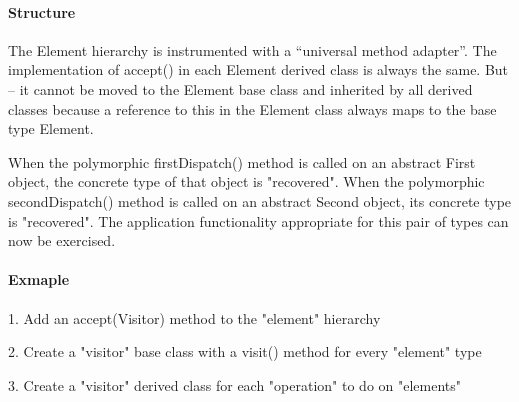\documentclass{book}
\begin{document}
\paragraph{Structure}
The Element hierarchy is instrumented with a ``universal method adapter''.
The implementation of accept() in each Element derived class is always the same.
But – it cannot be moved to the Element base class and inherited by all derived classes because a reference to this in the Element class always maps to the base type Element.
\begin{figure}[H]
\begin{floatrow}
\end{floatrow}
\end{figure}
When the polymorphic firstDispatch() method is called on an abstract First object, the concrete type of that object is "recovered".
When the polymorphic secondDispatch() method is called on an abstract Second object, its concrete type is "recovered".
The application functionality appropriate for this pair of types can now be exercised.
\begin{figure}[H]
\begin{floatrow}
\end{floatrow}
\end{figure}
\paragraph{Exmaple}\mbox{}
1.    Add an accept(Visitor) method to the "element" hierarchy

2.    Create a "visitor" base class with a visit() method for every "element" type

3.    Create a "visitor" derived class for each "operation" to do on "elements"
\end{document}
